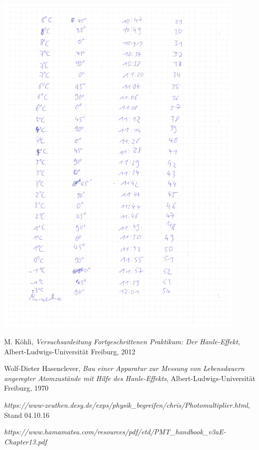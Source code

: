 \documentclass[12pt]{article}
\begin{document}
\begin{minipage}{\textwidth}
	\centering
	\includegraphics[width=0.9\textwidth]{laborbuch/laborbuch6.pdf}
\end{minipage}
\newpage
\listoffigures


\newpage
\thispagestyle{empty}
\begin{thebibliography}{9}

  

  
  

M. Köhli,
\emph{Versuchsanleitung Fortgeschrittenen Praktikum: Der Hanle-Effekt},
Albert-Ludwigs-Universität Freiburg,
2012

Wolf-Dieter Hasenclever,
\emph{Bau einer Apparatur zur Messung von Lebensdauern angeregter Atomzustände mit Hilfe des Hanle-Effekts},
Albert-Ludwigs-Universität Freiburg,
1970

\emph{https://www-zeuthen.desy.de/exps/physik\_begreifen/chris/Photomultiplier.html}, Stand 04.10.16

\emph{https://www.hamamatsu.com/resources/pdf/etd/PMT\_handbook\_v3aE-Chapter13.pdf}
\end{thebibliography}
\end{document}
